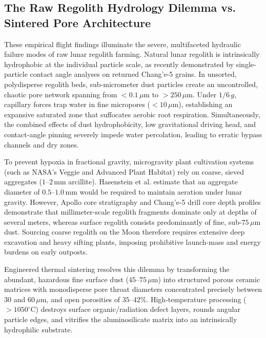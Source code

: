 \subsection{The Raw Regolith Hydrology Dilemma vs. Sintered Pore Architecture}
\label{subsec:pore_engineering}

These empirical flight findings illuminate the severe, multifaceted hydraulic failure modes of raw lunar regolith farming. Natural lunar regolith is intrinsically hydrophobic at the individual particle scale, as recently demonstrated by single-particle contact angle analyses on returned Chang'e-5 grains\cite{zhang2025wettability}. In unsorted, polydisperse regolith beds, sub-micrometer dust particles create an uncontrolled, chaotic pore network spanning from $<0.1\,\mu\mathrm{m}$ to $>250\,\mu\mathrm{m}$\cite{paul2022plants,turci2015mechanistic}. Under $1/6\,g$, capillary forces trap water in fine micropores ($<10\,\mu\mathrm{m}$), establishing an expansive saturated zone that suffocates aerobic root respiration\cite{paul2022plants,ming1989lunar,stout2001evidence}. Simultaneously, the combined effects of dust hydrophobicity, low gravitational driving head, and contact-angle pinning severely impede water percolation, leading to erratic bypass channels and dry zones\cite{hasenstein2026assessing,zhang2025wettability}. 

To prevent hypoxia in fractional gravity, microgravity plant cultivation systems (such as NASA's Veggie and Advanced Plant Habitat) rely on coarse, sieved aggregates ($1\text{--}2\,\mathrm{mm}$ arcillite)\cite{hasenstein2026assessing,stout2001evidence,steinberg2007fluid}. Hasenstein et al. estimate that an aggregate diameter of $0.5\text{--}1.0\,\mathrm{mm}$ would be required to maintain aeration under lunar gravity\cite{hasenstein2026assessing}. However, Apollo core stratigraphy\cite{mckay1991lunar} and Chang'e-5 drill core depth profiles\cite{zhao2023variations} demonstrate that millimeter-scale regolith fragments dominate only at depths of several meters, whereas surface regolith consists predominantly of fine, sub-$75\,\mu\mathrm{m}$ dust. Sourcing coarse regolith on the Moon therefore requires extensive deep excavation and heavy sifting plants, imposing prohibitive launch-mass and energy burdens on early outposts\cite{hasenstein2026assessing}.

Engineered thermal sintering resolves this dilemma by transforming the abundant, hazardous fine surface dust ($45\text{--}75\,\mu\mathrm{m}$) into structured porous ceramic matrices with monodisperse pore throat diameters concentrated precisely between $30$ and $60\,\mu\mathrm{m}$, and open porosities of $35\text{--}42\%$\cite{ming1989lunar}. High-temperature processing ($>1050^\circ\mathrm{C}$) destroys surface organic/radiation defect layers, rounds angular particle edges, and vitrifies the aluminosilicate matrix into an intrinsically hydrophilic substrate\cite{ming1989lunar,taylor2005microwave,xi2026multiphysics}.

